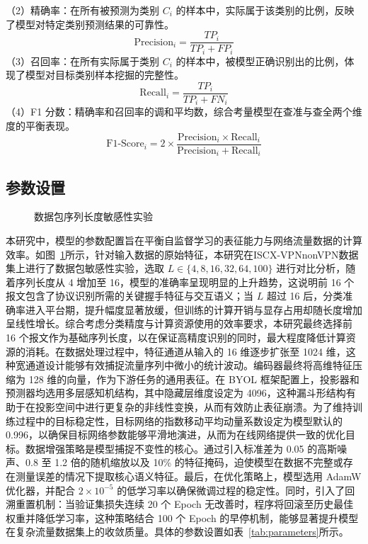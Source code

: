（2）精确率：在所有被预测为类别 $C_i$ 的样本中，实际属于该类别的比例，反映了模型对特定类别预测结果的可靠性。
\begin{equation}
  \text{Precision}_i = \frac{TP_i}{TP_i + FP_i}
  \label{eq:prec}
\end{equation}
（3）召回率：在所有实际属于类别 $C_i$ 的样本中，被模型正确识别出的比例，体现了模型对目标类别样本挖掘的完整性。
\begin{equation}
  \text{Recall}_i = \frac{TP_i}{TP_i + FN_i}
  \label{eq:recall}
\end{equation}
（4）F1 分数：精确率和召回率的调和平均数，综合考量模型在查准与查全两个维度的平衡表现。
\begin{equation}
  \text{F1-Score}_i = 2 \times \frac{\text{Precision}_i \times \text{Recall}_i}{\text{Precision}_i + \text{Recall}_i}
  \label{eq:f1}
\end{equation}

\subsection{参数设置}

\begin{figure}[ht]
  \centering
  \caption{数据包序列长度敏感性实验}
  \label{fig:sensitivity}
\end{figure}

本研究中，模型的参数配置旨在平衡自监督学习的表征能力与网络流量数据的计算效率。如图~\ref{fig:sensitivity}所示，针对输入数据的原始特征，本研究在ISCX-VPNnonVPN数据集上进行了数据包敏感性实验，选取 $L \in \{4, 8, 16, 32, 64, 100\}$ 进行对比分析，随着序列长度从 4 增加至 16，模型的准确率呈现明显的上升趋势，这说明前 16 个报文包含了协议识别所需的关键握手特征与交互语义；当 $L$ 超过 16 后，分类准确率进入平台期，提升幅度显著放缓，但训练的计算开销与显存占用却随长度增加呈线性增长。综合考虑分类精度与计算资源使用的效率要求，本研究最终选择前 16 个报文作为基础序列长度，以在保证高精度识别的同时，最大程度降低计算资源的消耗。在数据处理过程中，特征通道从输入的 16 维逐步扩张至 1024 维，这种宽通道设计能够有效捕捉流量序列中微小的统计波动。编码器最终将高维特征压缩为 128 维的向量，作为下游任务的通用表征。在 BYOL 框架配置上，投影器和预测器均选用多层感知机结构，其中隐藏层维度设定为 4096，这种漏斗形结构有助于在投影空间中进行更复杂的非线性变换，从而有效防止表征崩溃。为了维持训练过程中的目标稳定性，目标网络的指数移动平均动量系数设定为模型默认的 0.996，以确保目标网络参数能够平滑地演进，从而为在线网络提供一致的优化目标。数据增强策略是模型捕捉不变性的核心。通过引入标准差为 0.05 的高斯噪声、0.8 至 1.2 倍的随机缩放以及 10\% 的特征掩码，迫使模型在数据不完整或存在测量误差的情况下提取核心语义特征。最后，在优化策略上，模型选用 AdamW 优化器，并配合 $2 \times 10^{-5}$ 的低学习率以确保微调过程的稳定性。同时，引入了回溯重置机制：当验证集损失连续 20 个 Epoch 无改善时，程序将回滚至历史最佳权重并降低学习率，这种策略结合 100 个 Epoch 的早停机制，能够显著提升模型在复杂流量数据集上的收敛质量。具体的参数设置如表~\ref{tab:parameters}所示。

